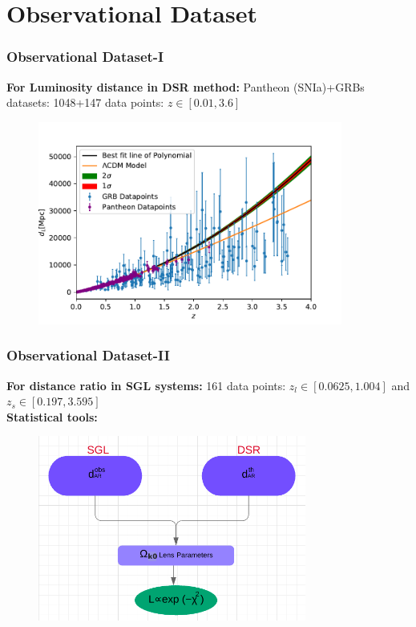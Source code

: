 \documentclass[xcolor=table,bigger]{beamer}
\begin{document}
 \section{ Observational Dataset}
\begin{frame}
 \frametitle{Observational Dataset-I}

  \textbf{For Luminosity distance in DSR method:} Pantheon (SNIa)+GRBs datasets: 1048+147 data points: $z\in[0.01,3.6]$
 \begin{figure}[ht!]
\centering
\includegraphics[width=100mm]{Pantheon_GRB_Polynomial_2nd_1048_147_dl}
\end{figure} 
 \end{frame}
\begin{frame}
 \frametitle{Observational Dataset-II}
 \textbf{For distance ratio in SGL systems:} 161 data points: \hspace*{3 cm}$z_l\in[0.0625,1.004]$ and \hspace*{0 cm}$z_s\in[0.197, 3.595]$
 \vspace{2mm}\\
 \textbf{Statistical tools:}
 \begin{figure}[ht!]
\centering
\includegraphics[width=88mm]{flowchart_eicp}
\end{figure} 
 \end{frame}
\end{document}
